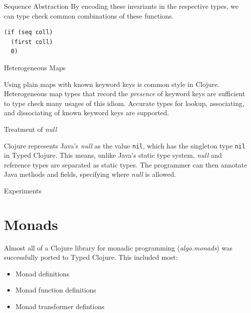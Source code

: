\documentclass[landscape,final,a0paper,fontscale=0.25]{baposter}
\begin{document}
\begin{poster}
\begin{posterbox}[name=sequenceabs,column=1]{Sequence Abstraction}
By encoding these invariants in the respective types, 
we can type check common combinations of these functions.

\begin{lstlisting}[caption={Assuming \lstinline|coll| is a collection of numbers, we can infer that this expression always returns a number}]
(if (seq coll)
  (first coll)
  0)
\end{lstlisting}

\end{posterbox}

\begin{posterbox}[name=hmaps,column=1,below=sequenceabs]{Heterogeneous Maps}

Using plain maps with known keyword keys is common style in Clojure.
Heterogeneous map types that record the \emph{presence} of keyword keys
are sufficient to type check many usages of this idiom.
Accurate types for lookup, associating, and dissociating of known keyword keys are supported.

\end{posterbox}


\begin{posterbox}[name=nulltreatment,column=1,below=hmaps]{Treatment of \emph{null}}

Clojure represents Java's \emph{null} as the value \lstinline|nil|,
which has the singleton type \lstinline|nil| in Typed Clojure.
This means, unlike Java's static type system, \emph{null} and reference types are separated as static types.
The programmer can then annotate Java methods and fields, specifying where \emph{null} is allowed.

\end{posterbox}


\begin{posterbox}[name=experiments,column=2]{Experiments}

\section*{Monads}

Almost all of a Clojure library for monadic programming (\emph{algo.monads}) was successfully ported
to Typed Clojure. This included most:
\begin{itemize}
  \item Monad definitions
  \item Monad function definitions
  \item Monad transformer defintions
\end{itemize}


\end{posterbox}
\end{poster}
\end{document}
